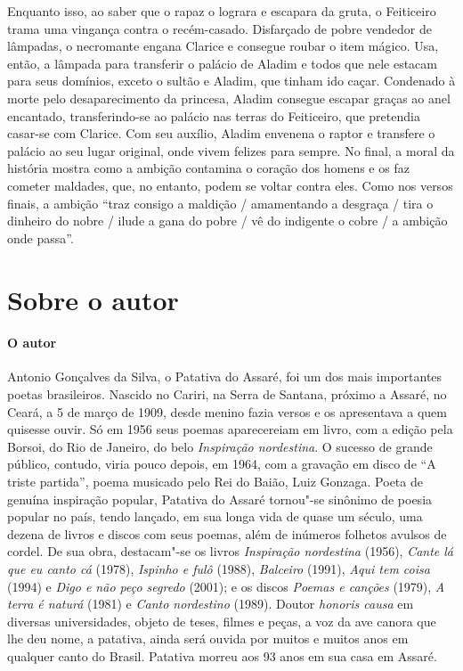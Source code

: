 \documentclass[11pt]{extarticle}
\begin{document}
Enquanto isso, ao saber que o rapaz o lograra e escapara da gruta, o Feiticeiro trama uma vingança contra o recém-casado. Disfarçado de pobre vendedor de lâmpadas, o necromante engana Clarice e consegue roubar o item mágico. Usa, então, a lâmpada para transferir o palácio de Aladim e todos que nele estacam para seus domínios, exceto o sultão e Aladim, que tinham ido caçar. Condenado à morte pelo desaparecimento da princesa, Aladim consegue escapar graças ao anel encantado, transferindo-se ao palácio nas terras do Feiticeiro, que pretendia casar-se com Clarice. Com seu auxílio, Aladim envenena o raptor e transfere o palácio ao seu lugar original, onde vivem felizes para sempre. No final, a moral da história mostra como a ambição contamina o coração dos homens e os faz cometer maldades, que, no entanto, podem se voltar contra eles. Como nos versos finais, a ambição ``traz consigo a maldição / amamentando a desgraça / tira o dinheiro do nobre / ilude a gana do pobre / vê do indigente o cobre / a ambição onde passa''.




\section{Sobre o autor}


\paragraph{O autor}
Antonio Gonçalves da Silva, o Patativa do Assaré, foi um dos mais importantes
poetas brasileiros. Nascido no Cariri, na Serra de Santana, próximo a Assaré,
no Ceará, a 5 de março de 1909, desde menino fazia versos e os apresentava a
quem quisesse ouvir. Só em 1956 seus poemas aparecereiam em livro, com a edição
pela Borsoi, do Rio de Janeiro, do belo \textit{Inspiração nordestina}. O
sucesso de grande público, contudo, viria pouco depois, em 1964, com a gravação
em disco de ``A triste partida'', poema musicado pelo Rei do Baião, Luiz
Gonzaga. Poeta de genuína inspiração popular, Patativa do Assaré tornou"-se
sinônimo de poesia popular no país, tendo lançado, em sua longa vida de quase
um século, uma dezena de livros e discos com seus poemas, além de inúmeros
folhetos avulsos de cordel. De sua obra, destacam"-se os livros
\textit{Inspiração nordestina} (1956), \textit{Cante lá que eu canto cá}
(1978), \textit{Ispinho e fulô} (1988), \textit{Balceiro} (1991), \textit{Aqui
tem coisa} (1994) e \textit{Digo e não peço segredo} (2001); e os discos
\textit{Poemas e canções} (1979), \textit{A terra é naturá} (1981) e
\textit{Canto nordestino} (1989). Doutor \textit{honoris causa} em diversas
universidades, objeto de teses, filmes e peças, a voz da ave canora que lhe deu
nome, a patativa, ainda será ouvida por muitos e muitos anos em qualquer canto
do Brasil. Patativa morreu aos 93 anos em sua casa em Assaré.
\end{document}

